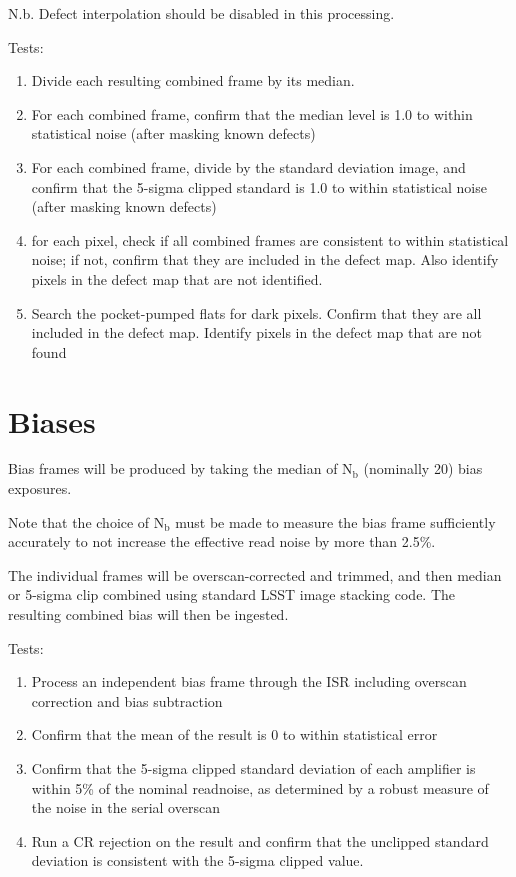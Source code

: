 \documentclass[DM,authoryear,toc,lsstdraft]{lsstdoc}
\begin{document}
N.b. Defect interpolation should be disabled in this processing.

Tests:
\begin{enumerate}
\item Divide each resulting combined frame by its median.
\item For each combined frame, confirm that the median level is 1.0 to within statistical noise
(after masking known defects)
\item For each combined frame, divide by the standard deviation image, and confirm that the 5-sigma
clipped standard is 1.0 to within statistical noise (after masking known defects)
\item for each pixel, check if all combined frames are consistent to within statistical noise;
if not, confirm that they are included in the defect map.  Also identify pixels in the
defect map that are not identified.
\item Search the pocket-pumped flats for dark pixels.  Confirm that they are all included in
the defect map.  Identify pixels in the defect map that are not found
\end{enumerate}

\section{Biases}

Bias frames will be produced by taking the median of N$_{\text{b}}$ (nominally 20) bias exposures.

Note that the choice of N$_{\text{b}}$ must be made to measure the bias frame sufficiently accurately to not
increase the effective read noise by more than 2.5\%.

The individual frames will be overscan-corrected and trimmed, and then median or 5-sigma clip combined using
standard LSST image stacking code.  The resulting combined bias will then be ingested.

Tests:
\begin{enumerate}
\item Process an independent bias frame through the ISR including overscan correction and bias subtraction
\item Confirm that the mean of the result is 0 to within statistical error
\item Confirm that the 5-sigma clipped standard deviation of each amplifier is within 5\% of
the nominal readnoise, as determined by a robust measure of the noise in the serial overscan
\item Run a CR rejection on the result and confirm that the unclipped standard deviation is
consistent with the 5-sigma clipped value.
\end{enumerate}
\end{document}
